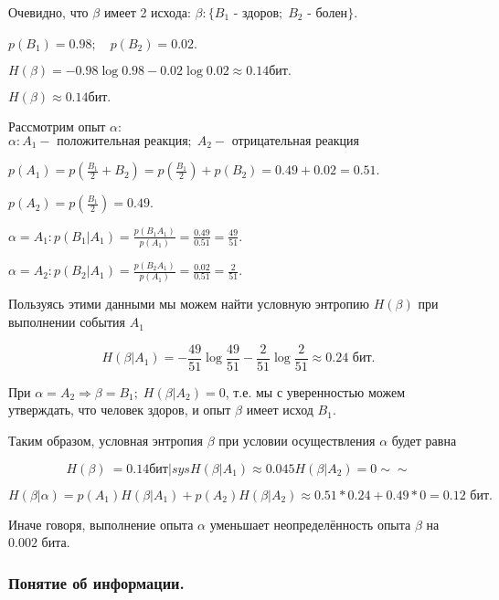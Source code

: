 \documentclass[a4paper,12pt]{report}
\begin{document}
	 Очевидно, что $\beta$ имеет 2 исхода: $\beta : \{B_1\mbox{ - здоров}; \; B_2\mbox{ - болен}\}$.
	
	$p(B_1) = 0.98; \quad p(B_2) = 0.02$.
	
	$H(\beta) = - 0.98 \log 0.98 - 0.02 \log 0.02 \approx 0.14 \mbox{бит}.$
	
	$H(\beta) \approx 0.14 бит.$
	 
	Рассмотрим опыт $\alpha$: \; $\alpha : {A_1 - \mbox{ положительная реакция}; \; A_2 - \mbox{ отрицательная реакция}}$

	$  p(A_1) = p(\frac{B_1}{2} + B_2) 
	          = p(\frac{B_1}{2}) + p(B_2)
	          = 0.49 + 0.02
	          = 0.51
	$.

	$  p(A_2) = p(\frac{B_1}{2}) 
	          = 0.49
	$.

	$
	  \alpha = A_1 : p(B_1|A_1)
	         = \frac{p(B_1 A_1)}{p(A_1)}
	         = \frac{0.49}{0.51}
	         = \frac{49}{51}.
	$
	
	$
	  \alpha = A_2 : p(B_2|A_1) 
	         = \frac{p(B_2 A_1)}{p(A_1)} 
	         = \frac{0.02}{0.51} 
	         = \frac{2}{51}. 
	$
	
	Пользуясь этими данными мы можем найти условную энтропию $H(\beta)$ при выполнении события $A_1$

	$$
	  H(\beta|A_1) = - \frac{49}{51} \log \frac{49}{51}
	                 - \frac{2}{51}  \log \frac{2}{51}
	         \approx 0.24 \mbox{ бит.}
	$$
	
	При $\alpha = A_2 \Rightarrow \beta = B_1; \; H(\beta|A_2) = 0$, т.е. мы с уверенностью можем утверждать, что человек здоров, и опыт $\beta$ имеет исход $B_1$.
	
	Таким образом, условная энтропия $\beta$ при условии осуществления $\alpha$ будет равна 
	
	$$
	  H(\beta) ~= 0.14 бит | sys 	H(\beta|A_1) \approx 0.045
					H(\beta|A_2) = 0 \sim \sim
	$$
				
	$$
	  H(\beta|\alpha) = p(A_1)H(\beta|A_1) + p(A_2)H(\beta|A_2) 
	            \approx 0.51 * 0.24 + 0.49 * 0
	                  = 0.12 \mbox{ бит.}
	$$
	
	Иначе говоря, выполнение опыта $\alpha$ уменьшает неопределённость опыта $\beta$ на $0.002$ бита.
	
	
	
	\subsubsection{Понятие об информации.}
	
\end{document}
